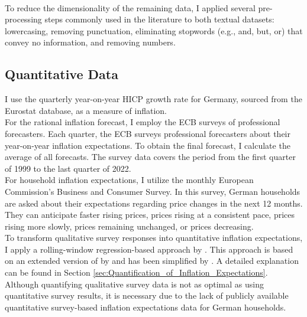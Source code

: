 \documentclass[review]{elsarticle}
\begin{document}
\\
To reduce the dimensionality of the remaining data, I applied several pre-processing steps commonly used in the literature to both textual datasets: lowercasing, removing punctuation, eliminating stopwords (e.g., and, but, or) that convey no information, and removing numbers.

\subsection{Quantitative Data} \label{sec:Quantitative_Data}

I use the quarterly year-on-year HICP growth rate for Germany, sourced from the Eurostat database, as a measure of inflation.
\\
For the rational inflation forecast, I employ the ECB surveys of professional forecasters. Each quarter, the ECB surveys professional forecasters about their year-on-year inflation expectations. To obtain the final forecast, I calculate the average of all forecasts. The survey data covers the period from the first quarter of 1999 to the last quarter of 2022.
\\
For household inflation expectations, I utilize the monthly European Commission's Business and Consumer Survey. In this survey, German households are asked about their expectations regarding price changes in the next 12 months. They can anticipate faster rising prices, prices rising at a consistent pace, prices rising more slowly, prices remaining unchanged, or prices decreasing.
\\
To transform qualitative survey responses into quantitative inflation expectations, I apply a rolling-window regression-based approach by \cite{Lahiri2015}. This approach is based on an extended version of \cite{Carlson1975} by \cite{Berk1999} and has been simplified by \cite{Rosenblatt-Wisch2015}. A detailed explanation can be found in Section \ref{sec:Quantification_of_Inflation_Expectations}.
\\
Although quantifying qualitative survey data is not as optimal as using quantitative survey results, it is necessary due to the lack of publicly available quantitative survey-based inflation expectations data for German households.
\end{document}
